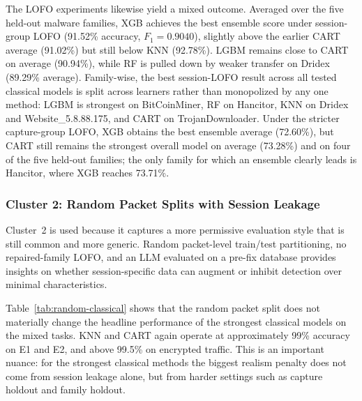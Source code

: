 \documentclass[letterpaper,twocolumn,10pt]{article}
\begin{document}
The LOFO experiments likewise yield a mixed outcome. Averaged over the five held-out malware families, XGB achieves the best ensemble score under session-group LOFO (91.52\% accuracy, $F_1=0.9040$), slightly above the earlier CART average (91.02\%) but still below KNN (92.78\%). LGBM remains close to CART on average (90.94\%), while RF is pulled down by weaker transfer on Dridex (89.29\% average). Family-wise, the best session-LOFO result across all tested classical models is split across learners rather than monopolized by any one method: LGBM is strongest on BitCoinMiner, RF on Hancitor, KNN on Dridex and Website\_5.8.88.175, and CART on TrojanDownloader. Under the stricter capture-group LOFO, XGB obtains the best ensemble average (72.60\%), but CART still remains the strongest overall model on average (73.28\%) and on four of the five held-out families; the only family for which an ensemble clearly leads is Hancitor, where XGB reaches 73.71\%.



\subsubsection{Cluster 2: Random Packet Splits with Session Leakage}

Cluster~2 is used because it captures a more permissive evaluation style that is still common and more generic. Random packet-level train/test partitioning, no repaired-family LOFO, and an LLM evaluated on a pre-fix database provides insights on whether session-specific data can augment or inhibit detection over minimal characteristics. 

Table~\ref{tab:random-classical} shows that the random packet split does not materially change the headline performance of the strongest classical models on the mixed tasks. KNN and CART again operate at approximately 99\% accuracy on E1 and E2, and above 99.5\% on encrypted traffic. This is an important nuance: for the strongest classical methods the biggest realism penalty does not come from session leakage alone, but from harder settings such as capture holdout and family holdout.
\end{document}
